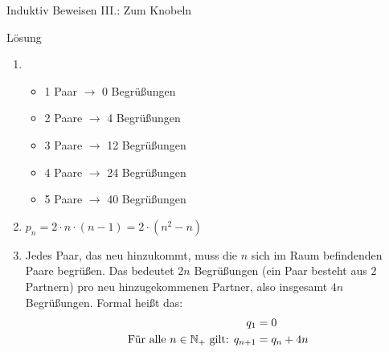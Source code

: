 \begin{frame}{Induktiv Beweisen III.: Zum Knobeln}
	\begin{block}{Lösung}
		\begin{enumerate}
			\item \begin{itemize}
				\item 1 Paar $\rightarrow$ 0 Begrüßungen
				\item 2 Paare $\rightarrow$ 4 Begrüßungen
				\item 3 Paare $\rightarrow$ 12 Begrüßungen
				\item 4 Paare $\rightarrow$ 24 Begrüßungen
				\item 5 Paare $\rightarrow$ 40 Begrüßungen
			\end{itemize} \pause
			\item $p_n = 2 \cdot n \cdot (n-1) = 2 \cdot (n^2 -n)$ \pause
			\item Jedes Paar, das neu hinzukommt, muss die $n$ sich im Raum befindenden Paare begrüßen. Das bedeutet $2n$ Begrüßungen (ein Paar besteht aus $2$ Partnern) pro neu hinzugekommenen Partner, also insgesamt $4n$ Begrüßungen. Formal heißt das: 
			\begin{align*}
				q_1 &= 0 \\
				\text{Für alle } n \in \mathbb{N}_+ \text{ gilt: } q_{n+1} &= q_n + 4n
			\end{align*}
			\setcounter{kevin}{\value{enumi}}
		\end{enumerate}
	\end{block}
\end{frame}

